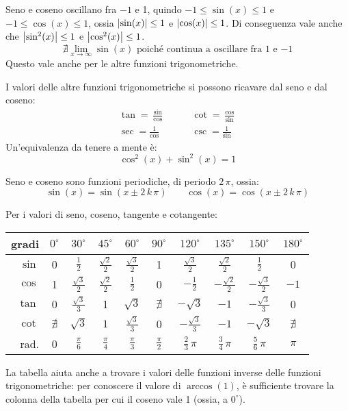 Seno e coseno oscillano fra $-1$ e 1, quindo $-1 \le \sin(x) \le 1$ e 
$-1 \le \cos(x) \le 1$, ossia $\left\lvert{\sin(x)}\right\rvert \le 1$ e $\left\lvert{\cos(x)}\right\rvert \le 1$.
Di conseguenza vale anche che $\left\lvert{\sin^2(x)}\right\rvert \le 1$ e 
$\left\lvert{\cos^2(x)}\right\rvert \le 1$.
\[
\nexists \lim_{x \to \infty} \sin(x) 
\text{ poich\'e continua a oscillare fra 1 e $-1$}
\]
Questo vale anche per le altre funzioni trigonometriche.

I valori delle altre funzioni trigonometriche si possono ricavare dal
seno e dal coseno:
\begin{align*}
\tan = \frac{\sin}{\cos} &\qquad \cot = \frac{\cos}{\sin} \\
\sec = \frac{1}{\cos} &\qquad \csc = \frac{1}{\sin}
\end{align*}
Un'equivalenza da tenere a mente \`e:
\[
\cos^2 (x) + \sin^2 (x) = 1
\]

Seno e coseno sono funzioni periodiche, di periodo $2 \, \pi$, ossia:
\[
\sin (x) = \sin (x \pm 2 \, k \, \pi) \qquad
\cos (x) = \cos (x \pm 2 \, k \, \pi)
\]

Per i valori di seno, coseno, tangente e cotangente:
\begin{center}
\begin{tabular}{r*{9}{|c}}
gradi & $0^{\circ}$ & $30^{\circ}$ & $45^{\circ}$ & $60^{\circ}$  & $90^{\circ}$ & $120^{\circ}$ & $135^{\circ}$ & $150^{\circ}$ & $180^{\circ}$ \\
\hline
$\sin$ & 0 & $\frac{1}{2}$ & $\frac{\sqrt{2}}{2}$ & $\frac{\sqrt{3}}{2}$ & 1 & $\frac{\sqrt{3}}{2}$ & $\frac{\sqrt{2}}{2}$ & $\frac{1}{2}$ & 0 \\
$\cos$ & 1 & $\frac{\sqrt{3}}{2}$ & $\frac{\sqrt{2}}{2}$ & $\frac{1}{2}$ & 0 & $-\frac{1}{2}$ & $- \frac{\sqrt{2}}{2}$ & $- \frac{\sqrt{3}}{2}$ & $-1$ \\
\hline
$\tan$ & 0 & $\frac{\sqrt{3}}{3}$ & 1 & $\sqrt{3}$ & $\nexists$ & $-\sqrt{3}$ & $-1$ & $-\frac{\sqrt{3}}{3}$ & 0 \\
$\cot$ & $\nexists$ & $\sqrt{3}$ & $1$ & $\frac{\sqrt{3}}{3}$ & 0 & $-\frac{\sqrt{3}}{3}$ & $- 1$ & $- \sqrt{3}$ & $\nexists$ \\
\hline
rad. & 0 & $\frac{\pi}{6}$ & $\frac{\pi}{4}$ & $\frac{\pi}{3}$  & $\frac{\pi}{2}$ & $\frac{2}{3} \, \pi$ & $\frac{3}{4} \, \pi$ & $\frac{5}{6} \, \pi$ & $\pi$ 
\end{tabular}
\end{center}
La tabella aiuta anche a trovare i valori delle funzioni inverse delle
funzioni trigonometriche: per conoscere il valore di $\arccos\left(1\right)$,
\`e sufficiente trovare la colonna della tabella per cui il coseno vale 1 
(ossia, a $0^{\circ}$).

